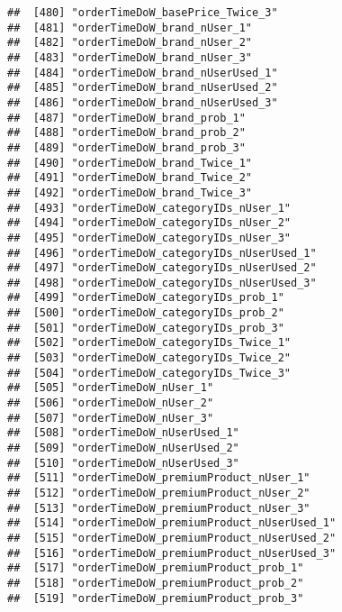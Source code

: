\documentclass[10pt]{report}
\begin{document}
\begin{verbatim}
##  [480] "orderTimeDoW_basePrice_Twice_3"                       
##  [481] "orderTimeDoW_brand_nUser_1"                           
##  [482] "orderTimeDoW_brand_nUser_2"                           
##  [483] "orderTimeDoW_brand_nUser_3"                           
##  [484] "orderTimeDoW_brand_nUserUsed_1"                       
##  [485] "orderTimeDoW_brand_nUserUsed_2"                       
##  [486] "orderTimeDoW_brand_nUserUsed_3"                       
##  [487] "orderTimeDoW_brand_prob_1"                            
##  [488] "orderTimeDoW_brand_prob_2"                            
##  [489] "orderTimeDoW_brand_prob_3"                            
##  [490] "orderTimeDoW_brand_Twice_1"                           
##  [491] "orderTimeDoW_brand_Twice_2"                           
##  [492] "orderTimeDoW_brand_Twice_3"                           
##  [493] "orderTimeDoW_categoryIDs_nUser_1"                     
##  [494] "orderTimeDoW_categoryIDs_nUser_2"                     
##  [495] "orderTimeDoW_categoryIDs_nUser_3"                     
##  [496] "orderTimeDoW_categoryIDs_nUserUsed_1"                 
##  [497] "orderTimeDoW_categoryIDs_nUserUsed_2"                 
##  [498] "orderTimeDoW_categoryIDs_nUserUsed_3"                 
##  [499] "orderTimeDoW_categoryIDs_prob_1"                      
##  [500] "orderTimeDoW_categoryIDs_prob_2"                      
##  [501] "orderTimeDoW_categoryIDs_prob_3"                      
##  [502] "orderTimeDoW_categoryIDs_Twice_1"                     
##  [503] "orderTimeDoW_categoryIDs_Twice_2"                     
##  [504] "orderTimeDoW_categoryIDs_Twice_3"                     
##  [505] "orderTimeDoW_nUser_1"                                 
##  [506] "orderTimeDoW_nUser_2"                                 
##  [507] "orderTimeDoW_nUser_3"                                 
##  [508] "orderTimeDoW_nUserUsed_1"                             
##  [509] "orderTimeDoW_nUserUsed_2"                             
##  [510] "orderTimeDoW_nUserUsed_3"                             
##  [511] "orderTimeDoW_premiumProduct_nUser_1"                  
##  [512] "orderTimeDoW_premiumProduct_nUser_2"                  
##  [513] "orderTimeDoW_premiumProduct_nUser_3"                  
##  [514] "orderTimeDoW_premiumProduct_nUserUsed_1"              
##  [515] "orderTimeDoW_premiumProduct_nUserUsed_2"              
##  [516] "orderTimeDoW_premiumProduct_nUserUsed_3"              
##  [517] "orderTimeDoW_premiumProduct_prob_1"                   
##  [518] "orderTimeDoW_premiumProduct_prob_2"                   
##  [519] "orderTimeDoW_premiumProduct_prob_3"                   

\end{verbatim}
\end{document}
